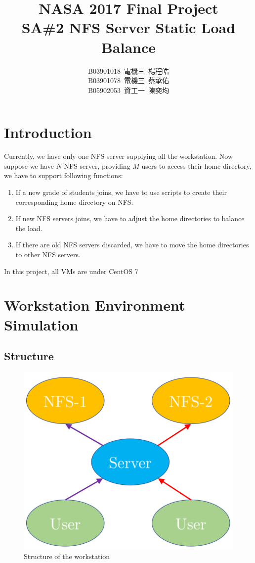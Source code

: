 \documentclass{article}
\title{NASA 2017 Final Project \\ SA\#2 NFS Server Static Load Balance}
\author{B03901018\, 電機三\, 楊程皓\\ B03901078\, 電機三\, 蔡承佑\\ B05902053\, 資工一\, 陳奕均}
\begin{document}
\newcommand{\red}[1]{\textcolor{red}{#1}}
\newcommand{\br}[1]{\left( #1 \right)}
\newcommand{\sbr}[1]{\left[ #1 \right]}
\newfontfamily{}
\maketitle
\section{Introduction}
Currently, we have only one NFS server supplying all the workstation. Now suppose we have $N$ NFS server, 
providing $M$ users to access their home directory, we have to support following functions:
   \begin{enumerate}
   \item If a new grade of students joins, we have to use scripts to create their corresponding home directory on NFS.
   \item If new NFS servers joins, we have to adjust the home directories to balance the load.
   \item If there are old NFS servers discarded, we have to move the home directories to other NFS servers.
   \end{enumerate}
In this project, all VMs are under CentOS 7
\section{Workstation Environment Simulation}
\subsection{Structure}
\begin{figure}[H]
\includegraphics[height=0.2\textheight]{Fig1.png}
\caption{Structure of the workstation}
\end{figure}
\end{document}
